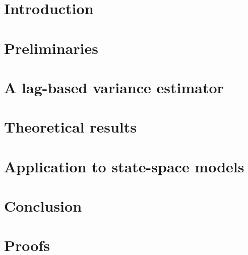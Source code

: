 \documentclass[preprint]{imsart}
\begin{document}
\section{Introduction}
\label{sec:introduction}


\section{Preliminaries}
\label{sec:preliminaries}


\section{A lag-based variance estimator}
\label{sec:estimator}


\section{Theoretical results}
\label{sec:theoretical:results}


\section{Application to state-space models}
\label{sec:numerical:study}
 

\section{Conclusion}
\label{sec:conclusion}


\appendix

\section{Proofs}
\label{sec:proofs}




\end{document}
